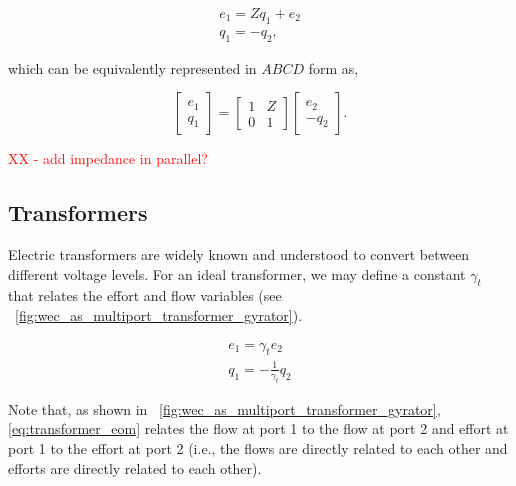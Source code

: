 \documentclass[lettersize,journal]{IEEEtran}
\newcommand{\rc}[1]{\textcolor{red}{#1}}
\begin{document}
\begin{subequations}
        \begin{align}
                e_1 = Zq_1 + e_2 \\
                q_1 = -q_2 ,
        \end{align}
        \label{eq:impedance_eom}
\end{subequations}

\noindent{} which can be equivalently represented in $ABCD$ form as,

\begin{equation}
        \begin{bmatrix}
                e_1 \\ q_1
        \end{bmatrix}
        =
        \begin{bmatrix}
                1 & Z \\ 0 & 1
        \end{bmatrix}
        \begin{bmatrix}
                e_2 \\ - q_2
        \end{bmatrix} .
        \label{eq:impedance_abcd}
\end{equation}

\noindent{}\rc{XX - add impedance in parallel?}

\subsection{Transformers}\label{sec:trasnformers}
Electric transformers are widely known and understood to convert between different voltage levels.
For an ideal transformer, we may define a constant $\gamma_{t}$ that relates the effort and flow variables (see \figurename~\ref{fig:wec_as_multiport_transformer_gyrator}).

\begin{subequations}
        \begin{align}
               e_1 = \gamma_{t} e_2 \\
               q_1 = -\frac{1}{\gamma_t} q_2
        \end{align}
        \label{eq:transformer_eom}
\end{subequations}

\noindent{}Note that, as shown in \figurename~\ref{fig:wec_as_multiport_transformer_gyrator}, \eqref{eq:transformer_eom} relates the flow at port 1 to the flow at port 2 and effort at port 1 to the effort at port 2 (i.e., the flows are directly related to each other and efforts are directly related to each other).
\end{document}
